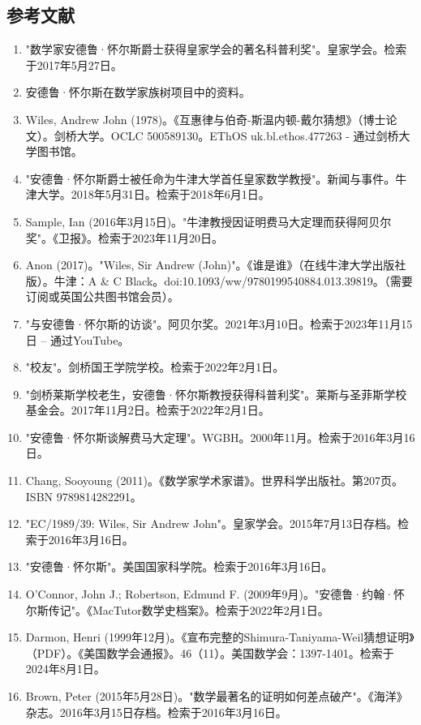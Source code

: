 \subsection{参考文献}  
\begin{enumerate}
\item "数学家安德鲁·怀尔斯爵士获得皇家学会的著名科普利奖"。皇家学会。检索于2017年5月27日。  
\item 安德鲁·怀尔斯在数学家族树项目中的资料。  
\item Wiles, Andrew John (1978)。《互惠律与伯奇-斯温内顿-戴尔猜想》（博士论文）。剑桥大学。OCLC 500589130。EThOS uk.bl.ethos.477263 - 通过剑桥大学图书馆。  
\item "安德鲁·怀尔斯爵士被任命为牛津大学首任皇家数学教授"。新闻与事件。牛津大学。2018年5月31日。检索于2018年6月1日。  
\item Sample, Ian (2016年3月15日)。"牛津教授因证明费马大定理而获得阿贝尔奖"。《卫报》。检索于2023年11月20日。  
\item Anon (2017)。"Wiles, Sir Andrew (John)"。《谁是谁》（在线牛津大学出版社版）。牛津：A & C Black。doi:10.1093/ww/9780199540884.013.39819。（需要订阅或英国公共图书馆会员）。  
\item "与安德鲁·怀尔斯的访谈"。阿贝尔奖。2021年3月10日。检索于2023年11月15日 – 通过YouTube。  
\item "校友"。剑桥国王学院学校。检索于2022年2月1日。  
\item "剑桥莱斯学校老生，安德鲁·怀尔斯教授获得科普利奖"。莱斯与圣菲斯学校基金会。2017年11月2日。检索于2022年2月1日。  
\item "安德鲁·怀尔斯谈解费马大定理"。WGBH。2000年11月。检索于2016年3月16日。  
\item Chang, Sooyoung (2011)。《数学家学术家谱》。世界科学出版社。第207页。ISBN 9789814282291。  
\item "EC/1989/39: Wiles, Sir Andrew John"。皇家学会。2015年7月13日存档。检索于2016年3月16日。  
\item "安德鲁·怀尔斯"。美国国家科学院。检索于2016年3月16日。  
\item O'Connor, John J.; Robertson, Edmund F. (2009年9月)。"安德鲁·约翰·怀尔斯传记"。《MacTutor数学史档案》。检索于2022年2月1日。  
\item Darmon, Henri (1999年12月)。《宣布完整的Shimura-Taniyama-Weil猜想证明》（PDF）。《美国数学会通报》。46（11）。美国数学会：1397-1401。检索于2024年8月1日。  
\item Brown, Peter (2015年5月28日)。"数学最著名的证明如何差点破产"。《海洋》杂志。2016年3月15日存档。检索于2016年3月16日。  

\end{enumerate}
